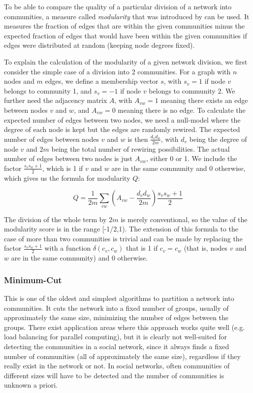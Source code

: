 To be able to compare the quality of a particular division of a network into communities, a measure called \textit{modularity} that was introduced by \cite{Newman_2006} can be used. It measures the fraction of edges that are within the given communities minus the expected fraction of edges that would have been within the given communities if edges were distributed at random (keeping node degrees fixed). 

To explain the calculation of the modularity of a given network division, we first consider the simple case of a division into 2 communities. For a graph with $n$ nodes and $m$ edges, we define a membership vector $s$, with $s_v = 1$ if node $v$ belongs to community 1, and $s_v = -1$ if node $v$ belongs to community 2. We further need the adjacency matrix $A$, with $A_{vw} = 1$ meaning there exists an edge between nodes $v$ and $w$, and $A_{vw} = 0$ meaning there is no edge. To calculate the expected number of edges between two nodes, we need a null-model where the degree of each node is kept but the edges are randomly rewired. The expected number of edges between nodes $v$ and $w$ is then $\frac{d_v d_w}{2m}$, with $d_v$ being the degree of node $v$ and $2m$ being the total number of rewiring possibilities. The actual number of edges between two nodes is just $A_{vw}$, either 0 or 1. We include the factor $\frac{s_v s_w  + 1}{2}$, which is 1 if $v$ and $w$ are in the same community and 0 otherwise, which gives us the formula for modularity $Q$:

\begin{equation}
Q = \frac{1}{2m} \sum_{vw}(A_{vw} - \frac{d_v d_w}{2m}) \frac{s_v s_w  + 1}{2}
\label{eq:modularity}
\end{equation}

The division of the whole term by $2m$ is merely conventional, so the value of the modularity score is in the range [-1/2,1). The extension of this formula to the case of more than two communities is trivial and can be made by replacing the factor $\frac{s_v s_w  + 1}{2}$ with a function $\delta(c_v, c_w)$ that is 1 if $c_v = c_w$ (that is, nodes $v$ and $w$ are in the same community) and 0 otherwise.

\subsubsection{Minimum-Cut}
\label{ssst:minimumcut} This is one of the oldest and simplest algorithms to partition a network into communities. It cuts the network into a fixed number of groups, usually of approximately the same size, minimizing the number of edges between the groups. There exist application areas where this approach works quite well (e.g. load balancing  for parallel computing), but it is clearly not well-suited for detecting the communities in a social network, since it always finds a fixed number of communities (all of approximately the same size), regardless if they really exist in the network or not. In social networks, often communities of different sizes will have to be detected and the number of communities is unknown a priori.

